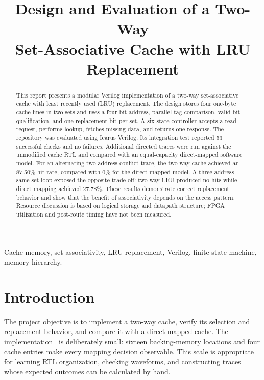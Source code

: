 \documentclass[conference]{IEEEtran}
\begin{document}
\title{Design and Evaluation of a Two-Way\\Set-Associative Cache with LRU Replacement}

\author{
}

\maketitle

\begin{abstract}
This report presents a modular Verilog implementation of a two-way
set-associative cache with least recently used (LRU) replacement. The
design stores four one-byte cache lines in two sets and uses a four-bit
address, parallel tag comparison, valid-bit qualification, and one
replacement bit per set. A six-state controller accepts a read request,
performs lookup, fetches missing data, and returns one response. The
repository was evaluated using Icarus Verilog. Its integration test
reported 53 successful checks and no failures. Additional directed traces
were run against the unmodified cache RTL and compared with an
equal-capacity direct-mapped software model. For an alternating
two-address conflict trace, the two-way cache achieved an 87.50\% hit
rate, compared with 0\% for the direct-mapped model. A three-address
same-set loop exposed the opposite trade-off: two-way LRU produced no
hits while direct mapping achieved 27.78\%. These results demonstrate
correct replacement behavior and show that the benefit of associativity
depends on the access pattern. Resource discussion is based on logical
storage and datapath structure; FPGA utilization and post-route timing
have not been measured.
\end{abstract}

\begin{IEEEkeywords}
Cache memory, set associativity, LRU replacement, Verilog, finite-state
machine, memory hierarchy.
\end{IEEEkeywords}

\section{Introduction}

The project objective is to implement a two-way cache, verify its
selection and replacement behavior, and compare it with a direct-mapped
cache. The implementation~\cite{repo} is deliberately small: sixteen
backing-memory locations and four cache entries make every mapping
decision observable. This scale is appropriate for learning RTL
organization, checking waveforms, and constructing traces whose expected
outcomes can be calculated by hand.
\end{document}
